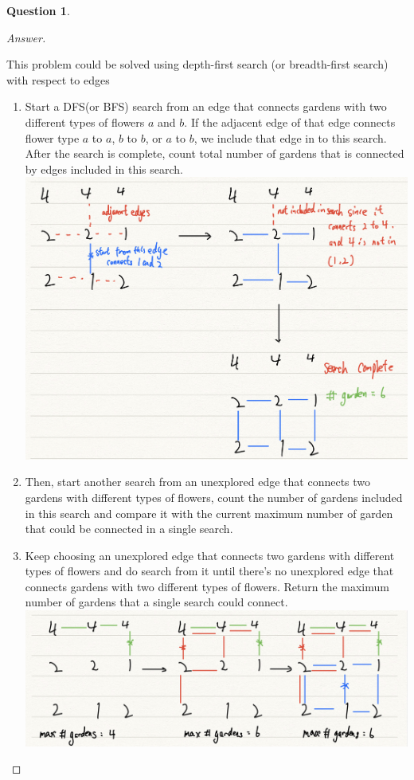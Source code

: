 \documentclass{article}
\theoremstyle{plain}
\newtheorem{question}{Question}
\newenvironment{answer}[1][Answer]
    {\begin{proof}[#1]{$ $}\renewcommand\qedsymbol{$\vartriangle$}}
    {\end{proof}}
\begin{document}
\begin{question}
\end{question}
\begin{answer}
    \begin{enumerate}
        This problem could be solved using depth-first search (or breadth-first search) with respect to edges
        \begin{enumerate}
            \item
            Start a DFS(or BFS) search from an edge that connects gardens with two different types of flowers $a$ and $b$. If the adjacent edge of that edge connects flower type $a$ to $a$, $b$ to $b$,  or $a$ to $b$, we include that edge in to this search. After the search is complete, count total number of gardens that is connected by edges included in this search. \\
            \includegraphics[width=0.9\columnwidth]{Q8(1).jpeg}
            \item
            Then, start another search from an unexplored edge that connects two gardens with different types of flowers, count the number of gardens included in this search and compare it with the current maximum number of garden that could be connected in a single search.
            \item
            Keep choosing an unexplored edge that connects two gardens with different types of flowers and do search from it until there's no unexplored edge that connects gardens with two different types of flowers. Return the maximum number of gardens that a single search could connect.\\
            \includegraphics[width=0.9\columnwidth]{Q8(2).jpeg}

\end{enumerate}
\end{enumerate}
\end{answer}
\end{document}

